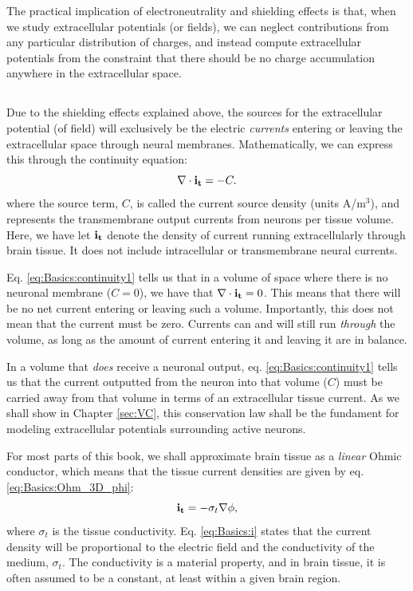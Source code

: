 The practical implication of electroneutrality and shielding effects is that, when we study extracellular potentials (or fields), we can neglect contributions from any particular distribution of charges, and instead compute extracellular potentials from the constraint that there should be no charge accumulation anywhere in the extracellular space. 


\subsection{}
\label{sec:Basics:C} 
Due to the shielding effects explained above, the sources for the extracellular potential (of field) will exclusively be the electric \textit{currents} entering or leaving the extracellular space through neural membranes. Mathematically, we can express this through the continuity equation:
\begin{equation}
\nabla \cdot {\bf i_t} = -C.
\label{eq:Basics:continuity1}
\end{equation}
where the source term, $C$, is called the current source density (units A/m$^3$), and represents  the transmembrane output currents from neurons per tissue volume. Here, we have let ${\bf i_t}$ denote the density of current running extracellularly through brain tissue. It does not include intracellular or transmembrane neural currents. 

Eq. \ref{eq:Basics:continuity1} tells us that in a volume of space where there is no neuronal membrane ($C = 0$), we have that $\nabla \cdot {\bf i_t} = 0$. This means that there will be no net current entering or leaving such a volume. Importantly, this does not mean that the current must be zero. Currents can and will still run \textit{through} the volume, as long as the amount of current entering it and leaving it are in balance. 

In a volume that \textit{does} receive a neuronal output, eq. \ref{eq:Basics:continuity1} tells us that the current outputted from the neuron into that volume ($C$) must be carried away from that volume in terms of an extracellular tissue current. As we shall show in Chapter \ref{sec:VC}, this conservation law shall be the fundament for modeling extracellular potentials surrounding active neurons.

For most parts of this book, we shall approximate brain tissue as a \textit{linear} Ohmic conductor, which means that the tissue current densities are given by eq. \ref{eq:Basics:Ohm_3D_phi}:
\begin{equation}
{\bf i_t} = - \sigma_t \nabla \phi, 
\label{eq:Basics:i}
\end{equation}
where $\sigma_t$ is the tissue conductivity. Eq. \ref{eq:Basics:i} states that the current density will be proportional to the electric field and the conductivity of the medium, $\sigma_t$. The conductivity is a material property, and in brain tissue, it is often assumed to be a constant, at least within a given brain region. 


